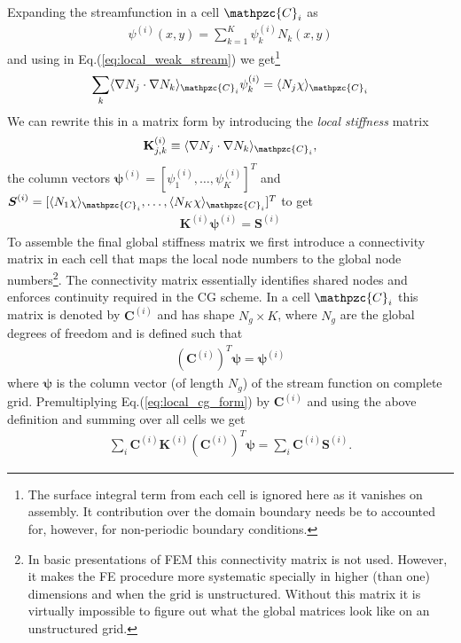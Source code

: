 \documentclass[11pt, reqno]{amsart}
\newcommand{\eqr}[1]{Eq.\thinspace(#1)}
\newcommand{\mvec}[1]{\mathbf{#1}}
\newcommand{\gvec}[1]{\boldsymbol{#1}}
\newcommand{\script}[1]{\mathpzc{#1}}
\newcommand{\iprod}[2]{\langle{#1}\rangle_{#2}}
\theoremstyle{definition}
\begin{document}
Expanding the streamfunction in a cell $\script{C}_i$ as
\begin{align}
  \psi^{(i)}(x,y) = \sum_{k=1}^K \psi_k^{(i)} N_k(x,y)
\end{align}
and using in \eqr{\ref{eq:local_weak_stream}} we get\footnote{The
  surface integral term from each cell is ignored here as it vanishes
  on assembly. It contribution over the domain boundary needs be to
  accounted for, however, for non-periodic boundary conditions.}
\begin{align}
  \sum_k
  \iprod{\nabla N_j\cdot \nabla N_k}{\script{C}_i} \psi_k^{(i)}
  =
  \iprod{N_j\chi}{\script{C}_i}
\end{align}
We can rewrite this in a matrix form by introducing the \emph{local
  stiffness}  matrix
\begin{align}
  \mvec{K}^{(i)}_{j,k} \equiv \iprod{\nabla N_j\cdot \nabla N_k}{\script{C}_i},
\end{align}
the column vectors $\gvec{\psi}^{(i)} =
[\psi^{(i)}_1,\ldots,\psi^{(i)}_K]^T$ and $\gvec{S}^{(i)} =
[\iprod{N_1\chi}{\script{C}_i},\ldots,\iprod{N_K\chi}{\script{C}_i}]^T$
to get
\begin{align}
  \mvec{K}^{(i)}\gvec{\psi}^{(i)}
  =
  \mvec{S}^{(i)} \label{eq:local_cg_form}
\end{align}
To assemble the final global stiffness matrix we first introduce a
connectivity matrix in each cell that maps the local node numbers to
the global node numbers\footnote{In basic presentations of FEM this
  connectivity matrix is not used. However, it makes the FE procedure
  more systematic specially in higher (than one) dimensions and when
  the grid is unstructured. Without this matrix it is virtually
  impossible to figure out what the global matrices look like on an
  unstructured grid.}. The connectivity matrix essentially identifies
shared nodes and enforces continuity required in the CG scheme.  In a
cell $\script{C}_i$ this matrix is denoted by $\mvec{C}^{(i)}$ and has
shape $N_g\times K$, where $N_g$ are the global degrees of freedom and
is defined such that
\begin{align}
  (\mvec{C}^{(i)})^T \gvec{\psi} = \gvec{\psi}^{(i)}
\end{align}
where $\gvec{\psi}$ is the column vector (of length $N_g$) of the
stream function on complete grid. Premultiplying
\eqr{\ref{eq:local_cg_form}} by $\mvec{C}^{(i)}$ and using the above
definition and summing over all cells we get
\begin{align}
  \sum_i
  \mvec{C}^{(i)}
  \mvec{K}^{(i)}
  (\mvec{C}^{(i)})^T
  \gvec{\psi}
  =
  \sum_i
  \mvec{C}^{(i)} \mvec{S}^{(i)}.
\end{align}
\end{document}
